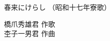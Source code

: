 \documentclass[10pt,b5j]{tarticle} %
\begin{document}
\begin{minipage}[c]{0.7\hsize} %
    \begin{center}
        {\LARGE
            春来にけらし %
        }
        {\small 
            （昭和十七年寮歌） %
        }
    \end{center}
\end{minipage}
\begin{minipage}[c]{0.3\hsize} %
    \begin{flushright} %
        橋爪秀雄君 作歌\\杢子一男君 作曲 %
    \end{flushright}
\end{minipage}
\end{document}
